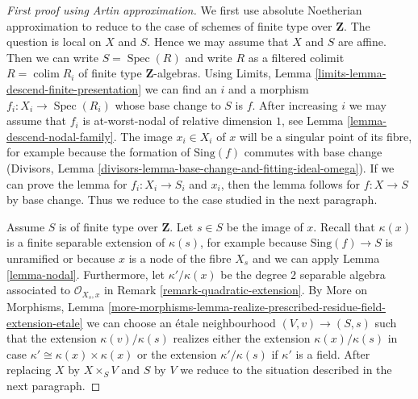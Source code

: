 \documentclass[10pt,a4paper]{amsart}
\theoremstyle{plain}
\theoremstyle{definition}
\theoremstyle{remark}
\numberwithin{equation}{subsection}
\def\colim{\mathop{\mathrm{colim}}\nolimits}
\def\Spec{\mathop{\mathrm{Spec}}}
\begin{document}
\begin{proof}[First proof using Artin approximation]
We first use absolute Noetherian approximation to reduce to the
case of schemes of finite type over $\mathbf{Z}$.
The question is local on $X$ and $S$. Hence we may assume that
$X$ and $S$ are affine. Then we can write $S = \Spec(R)$
and write $R$ as a filtered colimit $R = \colim R_i$
of finite type $\mathbf{Z}$-algebras.
Using Limits, Lemma \ref{limits-lemma-descend-finite-presentation}
we can find an $i$ and a morphism $f_i : X_i \to \Spec(R_i)$ whose base
change to $S$ is $f$. After increasing $i$ we may assume that $f_i$
is at-worst-nodal of relative dimension $1$, see
Lemma \ref{lemma-descend-nodal-family}.
The image $x_i \in X_i$ of $x$ will be a singular
point of its fibre, for example because the formation of
$\text{Sing}(f)$ commutes with base change (Divisors, Lemma
\ref{divisors-lemma-base-change-and-fitting-ideal-omega}).
If we can prove the lemma for $f_i : X_i \to S_i$ and
$x_i$, then the lemma follows for $f : X \to S$ by base
change. Thus we reduce to the case studied in the next
paragraph.

\medskip\noindent
Assume $S$ is of finite type over $\mathbf{Z}$. Let $s \in S$ be the
image of $x$. Recall that $\kappa(x)$ is a finite separable extension
of $\kappa(s)$, for example because $\text{Sing}(f) \to S$
is unramified or because $x$ is a node of the fibre $X_s$
and we can apply Lemma \ref{lemma-nodal}.
Furthermore, let $\kappa'/\kappa(x)$ be the
degree $2$ separable algebra associated to $\mathcal{O}_{X_s, x}$ in
Remark \ref{remark-quadratic-extension}.
By More on Morphisms, Lemma
\ref{more-morphisms-lemma-realize-prescribed-residue-field-extension-etale}
we can choose an \'etale neighbourhood $(V, v) \to (S, s)$
such that the extension $\kappa(v)/\kappa(s)$ realizes either
the extension $\kappa(x)/\kappa(s)$ in case
$\kappa' \cong \kappa(x) \times \kappa(x)$ or
the extension $\kappa'/\kappa(s)$ if $\kappa'$ is a field.
After replacing $X$ by $X \times_S V$ and $S$ by $V$
we reduce to the situation described in the next paragraph.


\end{proof}
\end{document}
